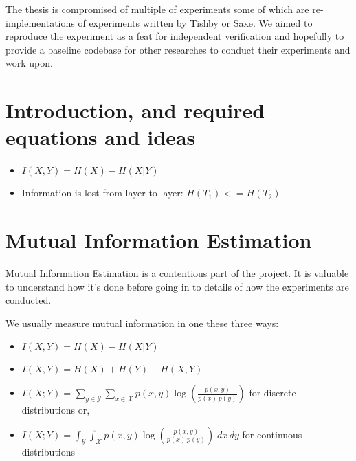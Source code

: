 
The thesis is compromised of multiple of experiments some of which are
re-implementations of experiments written by Tishby or Saxe. We aimed to
reproduce the experiment as a feat for independent verification and hopefully to
provide a baseline codebase for other researches to conduct their experiments
and work upon.


\section{Introduction, and required equations and ideas}

\begin{itemize}
  \item{
      $ I(X, Y) = H(X) - H(X|Y) $
    }
  \item{
      Information is lost from layer to layer:
      $ H(T_1) <= H(T_2) $
    }
\end{itemize}


\section{Mutual Information Estimation}

Mutual Information Estimation is a contentious part of the project. It is
valuable to understand how it's done before going in to details of how the
experiments are conducted.
 
We usually measure mutual information in one these three ways:

\begin{itemize}
  \item{
      $ I(X, Y) = H(X) - H(X|Y) $
    }
  \item{
      $ I(X, Y) = H(X) + H(Y) - H(X,Y) $
    }
  \item{
      $ {I} (X;Y)=\sum _{y\in {\mathcal {Y}}}\sum _{x\in {\mathcal
      {X}}}{p(x,y)\log {\left({\frac {p(x,y)}{p(x)\,p(y)}}\right)}} $ for
      discrete distributions or,    
    }
	\item{
    ${I} (X;Y)=\int _{\mathcal {Y}}\int _{\mathcal {X}}{p(x,y)\log {\left({\frac
    {p(x,y)}{p(x)\,p(y)}}\right)}}\;dx\,dy$ for continuous distributions

	  }
\end{itemize}

